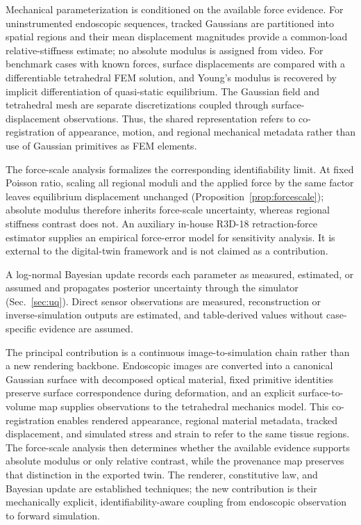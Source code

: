 \documentclass[pdflatex,lineno,referee,sn-vancouver,Numbered]{sn-jnl}
\begin{document}
Mechanical parameterization is conditioned on the available force
evidence. For uninstrumented endoscopic sequences, tracked Gaussians are
partitioned into spatial regions and their mean displacement magnitudes
provide a common-load relative-stiffness estimate; no absolute modulus is
assigned from video. For benchmark cases with known forces, surface
displacements are compared with a differentiable tetrahedral FEM solution,
and Young's modulus is recovered by implicit differentiation of
quasi-static equilibrium. The Gaussian field and tetrahedral mesh are
separate discretizations coupled through surface-displacement
observations. Thus, the shared representation refers to co-registration of
appearance, motion, and regional mechanical metadata rather than use of
Gaussian primitives as FEM elements.

The force-scale analysis formalizes the corresponding identifiability
limit. At fixed Poisson ratio, scaling all regional moduli and the applied
force by the same factor leaves equilibrium displacement unchanged
(Proposition~\ref{prop:forcescale}); absolute modulus therefore inherits
force-scale uncertainty, whereas regional stiffness contrast does not.
An auxiliary in-house R3D-18 retraction-force estimator supplies an
empirical force-error model for sensitivity analysis. It is external to
the digital-twin framework and is not claimed as a contribution.

A log-normal Bayesian update records each parameter as measured, estimated,
or assumed and propagates posterior uncertainty through the simulator
(Sec.~\ref{sec:uq}). Direct sensor observations are measured,
reconstruction or inverse-simulation outputs are estimated, and
table-derived values without case-specific evidence are assumed.

The principal contribution is a continuous image-to-simulation chain
rather than a new rendering backbone. Endoscopic images are converted into
a canonical Gaussian surface with decomposed optical material, fixed
primitive identities preserve surface correspondence during deformation,
and an explicit surface-to-volume map supplies observations to the
tetrahedral mechanics model. This co-registration enables rendered
appearance, regional material metadata, tracked displacement, and
simulated stress and strain to refer to the same tissue regions. The
force-scale analysis then determines whether the available evidence
supports absolute modulus or only relative contrast, while the provenance
map preserves that distinction in the exported twin. The renderer,
constitutive law, and Bayesian update are established techniques; the new
contribution is their mechanically explicit, identifiability-aware
coupling from endoscopic observation to forward simulation.
\end{document}
